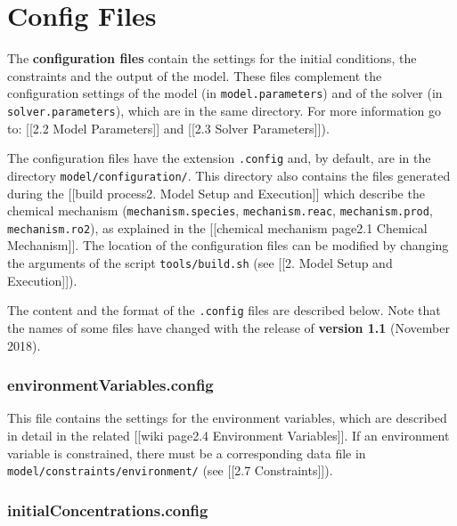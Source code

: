 \chapter{Config Files}

The \textbf{configuration files} contain the settings for the initial
conditions, the constraints and the output of the model. These files
complement the configuration settings of the model (in
\texttt{model.parameters}) and of the solver (in
\texttt{solver.parameters}), which are in the same directory. For more
information go to: {[}{[}2.2 Model Parameters{]}{]} and {[}{[}2.3 Solver
Parameters{]}{]}).

The configuration files have the extension \texttt{.config} and, by
default, are in the directory \texttt{model/configuration/}. This
directory also contains the files generated during the {[}{[}build
process\textbar{}2. Model Setup and Execution{]}{]} which describe the
chemical mechanism (\texttt{mechanism.species}, \texttt{mechanism.reac},
\texttt{mechanism.prod}, \texttt{mechanism.ro2}), as explained in the
{[}{[}chemical mechanism page\textbar{}2.1 Chemical Mechanism{]}{]}. The
location of the configuration files can be modified by changing the
arguments of the script \texttt{tools/build.sh} (see {[}{[}2. Model
Setup and Execution{]}{]}).

The content and the format of the \texttt{.config} files are described
below. Note that the names of some files have changed with the release
of \textbf{version 1.1} (November 2018).

\hypertarget{environmentvariables.config}{%
\subsection{environmentVariables.config}\label{environmentvariables.config}}

This file contains the settings for the environment variables, which are
described in detail in the related {[}{[}wiki page\textbar{}2.4
Environment Variables{]}{]}. If an environment variable is constrained,
there must be a corresponding data file in
\texttt{model/constraints/environment/} (see {[}{[}2.7
Constraints{]}{]}).

\hypertarget{initialconcentrations.config}{%
\subsection{initialConcentrations.config}\label{initialconcentrations.config}}

